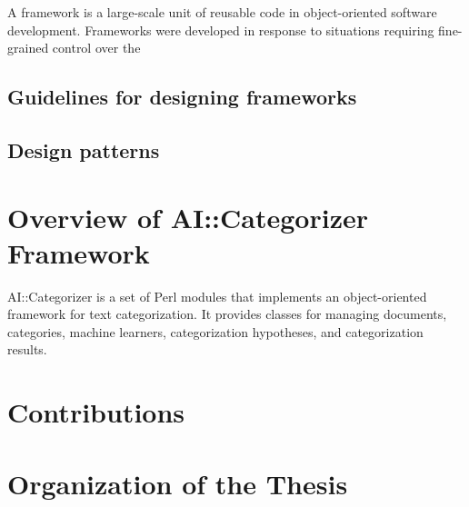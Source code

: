 A framework is a large-scale unit of reusable code in object-oriented
software development.  Frameworks were developed in response to
situations requiring fine-grained control over the

\subsection{Guidelines for designing frameworks}
\subsection{Design patterns}


\section{Overview of AI::Categorizer Framework}

AI::Categorizer is a set of Perl modules that implements an
object-oriented framework for text categorization.  It provides
classes for managing documents, categories, machine learners,
categorization hypotheses, and categorization results.

\section{Contributions}

\section{Organization of the Thesis}